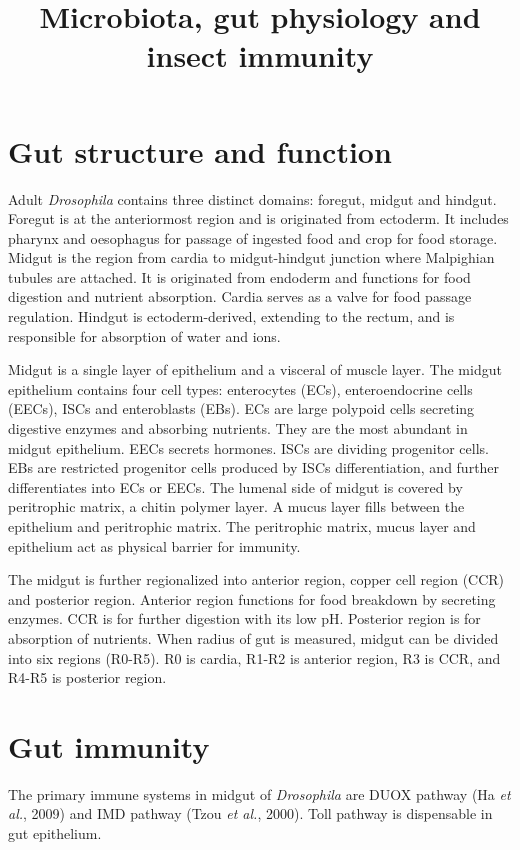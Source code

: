 \documentclass[11pt]{article}
\title{Microbiota, gut physiology and insect immunity}
\author{}
\date{}
\begin{document}
  \maketitle

  \linenumbers
\section{Gut structure and function}
Adult \textit{Drosophila} contains three distinct domains: foregut, midgut and hindgut. 
Foregut is at the anteriormost region and is originated from ectoderm. 
It includes pharynx and oesophagus for passage of ingested food and crop for food storage. 
Midgut is the region from cardia to midgut-hindgut junction where Malpighian tubules are attached. 
It is originated from endoderm and functions for food digestion and nutrient absorption. 
Cardia serves as a valve for food passage regulation. 
Hindgut is ectoderm-derived, extending to the rectum, and is responsible for absorption of water and ions.

\newline

Midgut is a single layer of epithelium and a visceral of muscle layer. 
The midgut epithelium contains four cell types: enterocytes (ECs), enteroendocrine cells (EECs), ISCs and enteroblasts (EBs). 
ECs are large polypoid cells secreting digestive enzymes and absorbing nutrients. 
They are the most abundant in midgut epithelium. 
EECs secrets hormones. 
ISCs are dividing progenitor cells. 
EBs are restricted progenitor cells produced by ISCs differentiation, and further differentiates into ECs or EECs. 
The lumenal side of midgut is covered by peritrophic matrix, a chitin polymer layer. 
A mucus layer fills between the epithelium and peritrophic matrix. 
The peritrophic matrix, mucus layer and epithelium act as physical barrier for immunity. 

\newline

The midgut is further regionalized into anterior region, copper cell region (CCR) and posterior region. 
Anterior region functions for food breakdown by secreting enzymes. 
CCR is for further digestion with its low pH. 
Posterior region is for absorption of nutrients. 
When radius of gut is measured, midgut can be divided into six regions (R0-R5). 
R0 is cardia, R1-R2 is anterior region, R3 is CCR, and R4-R5 is posterior region. 

\section{Gut immunity}
The primary immune systems in midgut of \textit{Drosophila} are DUOX pathway (Ha \textit{et al.}, 2009) and IMD pathway (Tzou \textit{et al.}, 2000). 
Toll pathway is dispensable in gut epithelium.
\end{document}
